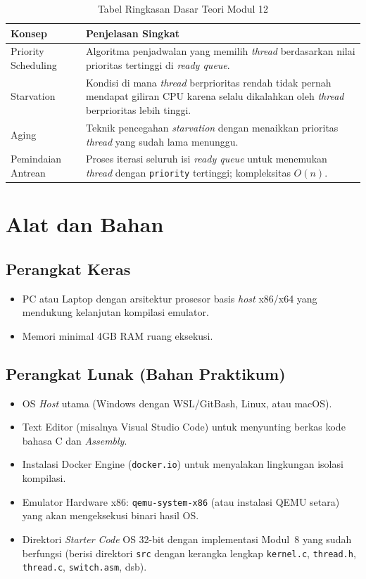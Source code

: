 \begin{table}[htbp]
	\caption{Tabel Ringkasan Dasar Teori Modul 12}
	\label{tab:m12-dasar-teori}
	\centering
	\begin{tabulary}{\textwidth}{|L|L|}
		\hline
		\textbf{Konsep} & \textbf{Penjelasan Singkat} \\ \hline
		Priority Scheduling
		& Algoritma penjadwalan yang memilih \textit{thread} berdasarkan nilai prioritas tertinggi di \textit{ready queue}. \\ \hline
		Starvation
		& Kondisi di mana \textit{thread} berprioritas rendah tidak pernah mendapat giliran CPU karena selalu dikalahkan oleh \textit{thread} berprioritas lebih tinggi. \\ \hline
		Aging
		& Teknik pencegahan \textit{starvation} dengan menaikkan prioritas \textit{thread} yang sudah lama menunggu. \\ \hline
		Pemindaian Antrean
		& Proses iterasi seluruh isi \textit{ready queue} untuk menemukan \textit{thread} dengan \texttt{priority} tertinggi; kompleksitas $O(n)$. \\ \hline
	\end{tabulary}
\end{table}

\newpage
\section{Alat dan Bahan}
\label{sec:m12-alat-bahan}

\subsection{Perangkat Keras}
\begin{itemize}
	\item PC atau Laptop dengan arsitektur prosesor basis \textit{host} x86/x64 yang mendukung kelanjutan kompilasi emulator.
	\item Memori minimal 4GB RAM ruang eksekusi.
\end{itemize}

\subsection{Perangkat Lunak (Bahan Praktikum)}
\begin{itemize}
	\item OS \textit{Host} utama (Windows dengan WSL/GitBash, Linux, atau macOS).
	\item Text Editor (misalnya Visual Studio Code) untuk menyunting berkas kode bahasa C dan \textit{Assembly}.
	\item Instalasi Docker Engine (\texttt{docker.io}) untuk menyalakan lingkungan isolasi kompilasi.
	\item Emulator Hardware x86: \texttt{qemu-system-x86} (atau instalasi QEMU setara) yang akan mengeksekusi binari hasil OS.
	\item Direktori \textit{Starter Code} OS 32-bit dengan implementasi Modul~8 yang sudah berfungsi (berisi direktori \texttt{src} dengan kerangka lengkap \texttt{kernel.c}, \texttt{thread.h}, \texttt{thread.c}, \texttt{switch.asm}, dsb).
\end{itemize}

